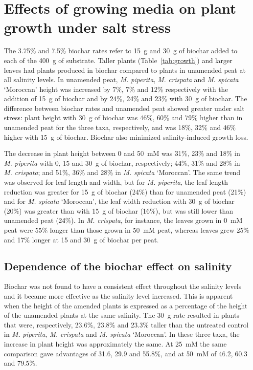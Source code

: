 \section{Effects of growing media on plant growth under salt stress}

The 3.75\% and 7.5\% biochar rates refer to 15~g and 30~g of biochar added to each of the 400~g of substrate. Taller plants (Table~\ref{tab:growth}) and larger leaves had plants produced in biochar compared to plants in unamended peat at all salinity levels. In unamended peat, \textit{M. piperita}, \textit{M. crispata} and \textit{M. spicata} `Moroccan' height was increased by 7\%, 7\% and 12\% respectively with the addition of 15~g of biochar and by 24\%, 24\% and 23\% with 30~g of biochar. The difference between biochar rates and unamended peat showed greater under salt stress: plant height with 30~g of biochar was 46\%, 60\% and 79\% higher than in unamended peat for the three taxa, respectively, and was 18\%, 32\% and 46\% higher with 15~g of biochar. Biochar also minimized salinity-induced growth loss.

The decrease in plant height between 0 and 50~mM was 31\%, 23\% and 18\% in \textit{M. piperita} with 0, 15 and 30~g of biochar, respectively; 44\%, 31\% and 28\% in \textit{M. crispata}; and 51\%, 36\% and 28\% in \textit{M. spicata} `Moroccan'. The same trend was observed for leaf length and width, but for \textit{M. piperita}, the leaf length reduction was greater for 15~g of biochar (24\%) than for unamended peat (21\%) and for \textit{M. spicata} `Moroccan', the leaf width reduction with 30~g of biochar (20\%) was greater than with 15~g of biochar (16\%), but was still lower than unamended peat (24\%). In \textit{M. crispata}, for instance, the leaves grown in 0~mM peat were 55\% longer than those grown in 50~mM peat, whereas leaves grew 25\% and 17\% longer at 15 and 30~g of biochar per peat.

\subsection{Dependence of the biochar effect on salinity}

Biochar was not found to have a consistent effect throughout the salinity levels and it became more effective as the salinity level increased. This is apparent when the height of the amended plants is expressed as a percentage of the height of the unamended plants at the same salinity. The 30~g rate resulted in plants that were, respectively, 23.6\%, 23.8\% and 23.3\% taller than the untreated control in \textit{M. piperita}, \textit{M. crispata} and \textit{M. spicata} `Moroccan'. In these three taxa, the increase in plant height was approximately the same. At 25~mM the same comparison gave advantages of 31.6, 29.9 and 55.8\%, and at 50~mM of 46.2, 60.3 and 79.5\%.

